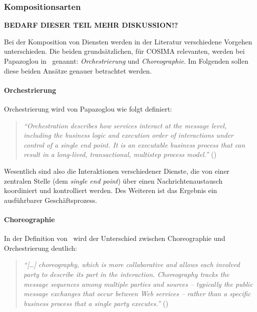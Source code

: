 \subsubsection{Kompositionsarten} %
\label{ssub:kompositionsarten}

  \textbf{BEDARF DIESER TEIL MEHR DISKUSSION!?}

  Bei der Komposition von Diensten werden in der Literatur verschiedene Vorgehen unterschieden. Die beiden grundsätzlichen, für COSIMA relevanten, werden bei Papazoglou in~\citep[S. 41]{papazoglou2007soc} genannt: \emph{Orchestrierung} und \emph{Choreographie}. Im Folgenden sollen diese beiden Ansätze genauer betrachtet werden.
  
\paragraph{Orchestrierung} %
\label{par:orchestrierung}
  
  Orchestrierung wird von Papazoglou wie folgt definiert:
  
  \begin{quote}
    \emph{"`Orchestration describes how services interact at the message level, including the business logic and execution order of interactions under control of a single end point. It is an executable business process that can result in a long-lived, transactional, multistep process model."'} (\citep[S. 41]{papazoglou2007soc})
  \end{quote}
  
  Wesentlich sind also die Interaktionen verschiedener Dienste, die von einer zentralen Stelle (dem \emph{single end point}) über einen Nachrichtenaustausch koordiniert und kontrolliert werden. Des Weiteren ist das Ergebnis ein ausführbarer Geschäftsprozess.


\paragraph{Choreographie} %
\label{par:choreographie}

  In der Definition von~\citep{peltz2003wso} wird der Unterschied zwischen Choreographie und Orchestrierung deutlich:
  
  \begin{quote}
    \emph{"`[\ldots] choreography, which is more collaborative and allows each involved party to describe its part in the interaction. Choreography tracks the message sequences among multiple parties and sources -- typically the public message exchanges that occur between Web services -- rather than a specific business process that a single party executes."'} (\citep[S. 46]{peltz2003wso})
  \end{quote}

